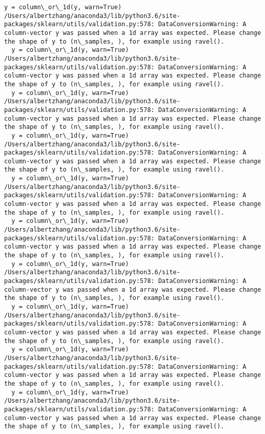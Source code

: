 \documentclass[11pt]{article}
\begin{document}
\begin{Verbatim}[commandchars=\\\{\}]
  y = column\_or\_1d(y, warn=True)
/Users/albertzhang/anaconda3/lib/python3.6/site-packages/sklearn/utils/validation.py:578: DataConversionWarning: A column-vector y was passed when a 1d array was expected. Please change the shape of y to (n\_samples, ), for example using ravel().
  y = column\_or\_1d(y, warn=True)
/Users/albertzhang/anaconda3/lib/python3.6/site-packages/sklearn/utils/validation.py:578: DataConversionWarning: A column-vector y was passed when a 1d array was expected. Please change the shape of y to (n\_samples, ), for example using ravel().
  y = column\_or\_1d(y, warn=True)
/Users/albertzhang/anaconda3/lib/python3.6/site-packages/sklearn/utils/validation.py:578: DataConversionWarning: A column-vector y was passed when a 1d array was expected. Please change the shape of y to (n\_samples, ), for example using ravel().
  y = column\_or\_1d(y, warn=True)
/Users/albertzhang/anaconda3/lib/python3.6/site-packages/sklearn/utils/validation.py:578: DataConversionWarning: A column-vector y was passed when a 1d array was expected. Please change the shape of y to (n\_samples, ), for example using ravel().
  y = column\_or\_1d(y, warn=True)
/Users/albertzhang/anaconda3/lib/python3.6/site-packages/sklearn/utils/validation.py:578: DataConversionWarning: A column-vector y was passed when a 1d array was expected. Please change the shape of y to (n\_samples, ), for example using ravel().
  y = column\_or\_1d(y, warn=True)
/Users/albertzhang/anaconda3/lib/python3.6/site-packages/sklearn/utils/validation.py:578: DataConversionWarning: A column-vector y was passed when a 1d array was expected. Please change the shape of y to (n\_samples, ), for example using ravel().
  y = column\_or\_1d(y, warn=True)
/Users/albertzhang/anaconda3/lib/python3.6/site-packages/sklearn/utils/validation.py:578: DataConversionWarning: A column-vector y was passed when a 1d array was expected. Please change the shape of y to (n\_samples, ), for example using ravel().
  y = column\_or\_1d(y, warn=True)
/Users/albertzhang/anaconda3/lib/python3.6/site-packages/sklearn/utils/validation.py:578: DataConversionWarning: A column-vector y was passed when a 1d array was expected. Please change the shape of y to (n\_samples, ), for example using ravel().
  y = column\_or\_1d(y, warn=True)
/Users/albertzhang/anaconda3/lib/python3.6/site-packages/sklearn/utils/validation.py:578: DataConversionWarning: A column-vector y was passed when a 1d array was expected. Please change the shape of y to (n\_samples, ), for example using ravel().
  y = column\_or\_1d(y, warn=True)
/Users/albertzhang/anaconda3/lib/python3.6/site-packages/sklearn/utils/validation.py:578: DataConversionWarning: A column-vector y was passed when a 1d array was expected. Please change the shape of y to (n\_samples, ), for example using ravel().

\end{Verbatim}
\end{document}

